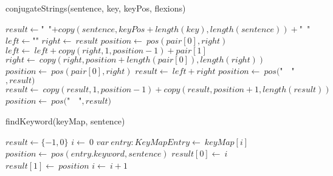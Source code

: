 \documentclass[a4paper,10pt]{article}
\begin{document}
\begin{algorithm}
\caption{conjugateStrings(sentence, key, keyPos, flexions)}
\begin{algorithmic}[5]

  \STATE \(result\gets\)"{}\ "{}\(+copy(sentence,keyPos+length(key),length(sentence))+\)"{}\ "{}\(\)
    \STATE \(left\gets\)"{}"{}\(\)
    \STATE \(right\gets\ result\)
    \STATE \(position\gets\ pos(pair[0],right)\)
      \STATE \(left\gets\ left+copy(right,1,position-1)+pair[1]\)
      \STATE \(right\gets\ copy(right,position+length(pair[0]),length(right))\)
      \STATE \(position\gets\ pos(pair[0],right)\)
    \ENDWHILE
    \STATE \(result\gets\ left+right\)
  \ENDFOR
  \STATE \(position\gets\ pos(\)"{}\ \ "{}\(,result)\)
    \STATE \(result\gets\ copy(result,1,position-1)+copy(result,position+1,length(result))\)
    \STATE \(position\gets\ pos(\)"{}\ \ "{}\(,result)\)
  \ENDWHILE

\end{algorithmic}
\end{algorithm}


\begin{algorithm}
\caption{findKeyword(keyMap, sentence)}
\begin{algorithmic}[5]

\STATE {}
\STATE {}
\STATE {}
\STATE {}
\STATE {}
\STATE {}
  \STATE \(result\gets\{-1,0\}\)
  \STATE \(i\gets\ 0\)
    \STATE \(var\ entry:KeyMapEntry\gets\ keyMap[i]\)
    \STATE \(position\gets\ pos(entry.keyword,sentence)\)
      \STATE \(result[0]\gets\ i\)
      \STATE \(result[1]\gets\ position\)
    \ENDIF
    \STATE \(i\gets\ i+1\)
  \ENDWHILE

\end{algorithmic}
\end{algorithm}
\end{document}
